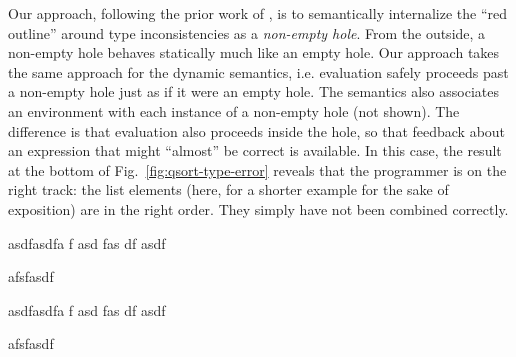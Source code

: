 Our approach, following the prior work of \citet{popl-paper}, 
is to semantically internalize the ``red outline'' around
type inconsistencies as a \emph{non-empty hole}.
From the outside, a non-empty hole behaves statically much like an empty hole.
Our approach takes the same approach for the dynamic semantics,
i.e. evaluation safely proceeds past a non-empty hole just as if it were an empty hole.
The semantics also associates an environment with each instance of a non-empty hole (not shown). 
The difference is that evaluation also proceeds inside the hole, so that 
feedback about an expression that might ``almost'' be correct is available. 
In this case, the result at the bottom of Fig.~\ref{fig:qsort-type-error}
reveals that the programmer is on the right track: the list elements 
(here, for a shorter example for the sake of exposition) are in the right order.
They simply have not been combined correctly.


asdfasdfa
f
asd
fas
df
asdf

afsfasdf


asdfasdfa
f
asd
fas
df
asdf

afsfasdf





